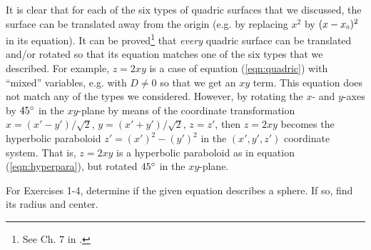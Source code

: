 It is clear that for each of the six types of quadric surfaces that we discussed, the surface can be translated away
from the origin (e.g. by replacing $x^2$ by $(x - x_{\scriptscriptstyle 0})^2$ in its equation). It can be proved\footnote{See
Ch. 7 in \cite{pog}.}
that \emph{every}
quadric surface can be translated and/or rotated so that its equation matches one of the six types that we described.
For example, $z = 2xy$ is a case of equation (\ref{eqn:quadric}) with ``mixed'' variables, e.g. with $D \ne 0$ so
that we get an $xy$ term. This equation does not match any of the types we considered. However, by rotating the $x$-
and $y$-axes by $45^\circ$ in the $xy$-plane by means of the coordinate transformation
$x = (x' - y')/\sqrt{2}$, $y = (x' + y')/\sqrt{2}$, $z = z'$, then $z = 2xy$ becomes
the hyperbolic paraboloid $z' = (x')^2 - (y')^2$ in the $(x',y',z')$ coordinate system. That is, $z = 2xy$ is a
hyperbolic paraboloid as in equation (\ref{eqn:hyperpara}), but rotated $45^\circ$ in the $xy$-plane.
\newpage
\centerline{}\label{sec1dot6}
\par\noindent For Exercises 1-4, determine if the given equation describes a sphere. If so, find its radius and
center.
